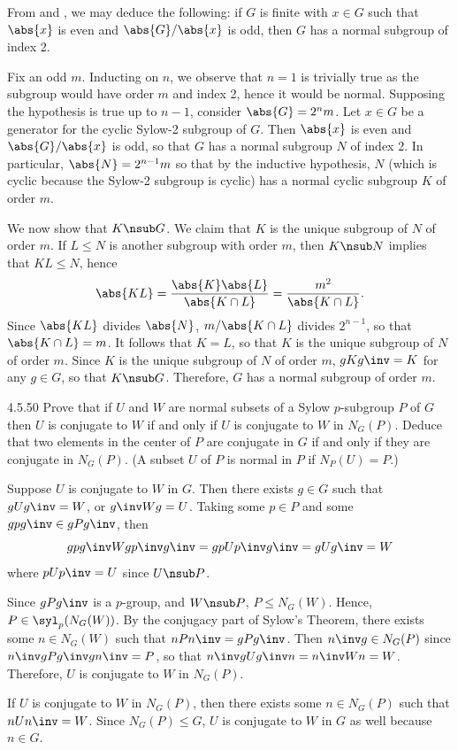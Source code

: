 \begin{sol}
	From  and , we may deduce the following: if $G$ is finite with $x \in G$ such that $\abs{x}$ is even and $\abs{G}/\abs{x}$ is odd, then $G$ has a normal subgroup of index 2.

	Fix an odd $m$.
	Inducting on $n$, we observe that $n = 1$ is trivially true as the subgroup would have order $m$ and index 2, hence it would be normal.
	Supposing the hypothesis is true up to $n - 1$, consider $\abs{G} = 2^nm$.
	Let $x \in G$ be a generator for the cyclic Sylow-2 subgroup of $G$.
	Then $\abs{x}$ is even and $\abs{G}/\abs{x}$ is odd, so that $G$ has a normal subgroup $N$ of index 2.
	In particular, $\abs{N} = 2^{n - 1}m$ so that by the inductive hypothesis, $N$ (which is cyclic because the Sylow-2 subgroup is cyclic) has a normal cyclic subgroup $K$ of order $m$.

	We now show that $K \nsub G$.
	We claim that $K$ is the unique subgroup of $N$ of order $m$.
	If $L \leq N$ is another subgroup with order $m$, then $K \nsub N$ implies that $KL \leq N$, hence
	\[
		\abs{KL} = \frac{\abs{K}\abs{L}}{\abs{K \cap L}} = \frac{m^2}{\abs{K \cap L}}.
	\]
	Since $\abs{KL}$ divides $\abs{N}$, $m/\abs{K \cap L}$ divides $2^{n - 1}$, so that $\abs{K \cap L} = m$.
	It follows that $K = L$, so that $K$ is the unique subgroup of $N$ of order $m$.
	Since $K$ is the unique subgroup of $N$ of order $m$, $gKg\inv = K$ for any $g \in G$, so that $K \nsub G$.
	Therefore, $G$ has a normal subgroup of order $m$.
\end{sol}

\begin{exercise}{4.5.50}
	Prove that if $U$ and $W$ are normal subsets of a Sylow $p$-subgroup $P$ of $G$ then $U$ is conjugate to $W$ if and only if $U$ is conjugate to $W$ in $N_G(P)$.
	Deduce that two elements in the center of $P$ are conjugate in $G$ if and only if they are conjugate in $N_G(P)$. (A subset $U$ of $P$ is normal in $P$ if $N_P(U) = P$.)
\end{exercise}

\begin{soliff}
	\rightimp Suppose $U$ is conjugate to $W$ in $G$.
	Then there exists $g \in G$ such that $gUg\inv = W$, or $g\inv Wg = U$.
	Taking some $p \in P$ and some $gpg\inv \in gPg\inv$, then
	\[
		gpg\inv W gp\inv g\inv = gpUp\inv g\inv = gUg\inv = W
	\]
	where $pUp\inv = U$ since $U \nsub P$.

	Since $gPg\inv$ is a $p$-group, and $W \nsub P$, $P \leq N_G(W)$.
	Hence, $P \in \syl_p(N_G(W))$.
	By the conjugacy part of Sylow's Theorem, there exists some $n \in N_G(W)$ such that $nPn\inv = gPg\inv$.
	Then $n\inv g \in N_G(P)$ since $n\inv gPg\inv gn\inv = P$, so that $n\inv gUg\inv n = n\inv Wn = W$.
	Therefore, $U$ is conjugate to $W$ in $N_G(P)$.

	\leftimp If $U$ is conjugate to $W$ in $N_G(P)$, then there exists some $n \in N_G(P)$ such that $nUn\inv = W$.
	Since $N_G(P) \leq G$, $U$ is conjugate to $W$ in $G$ as well because $n \in G$.
\end{soliff}

